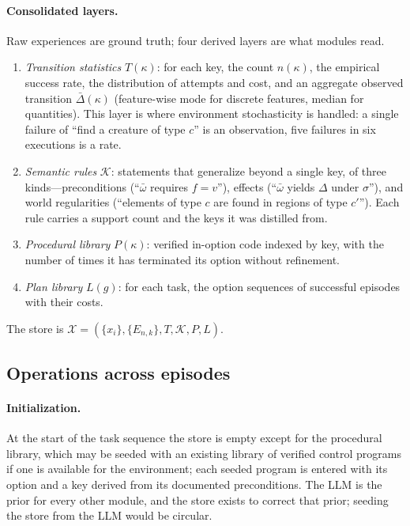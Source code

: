 \documentclass[11pt]{article}
\begin{document}
\paragraph{Consolidated layers.}
Raw experiences are ground truth; four derived layers are what modules read.
\begin{enumerate}[leftmargin=1.5em,itemsep=1pt]
\item \emph{Transition statistics} $T(\kappa)$: for each key, the count $n(\kappa)$, the empirical success rate, the distribution of attempts and cost, and an aggregate observed transition $\bar\Delta(\kappa)$ (feature-wise mode for discrete features, median for quantities). This layer is where environment stochasticity is handled: a single failure of ``find a creature of type $c$'' is an observation, five failures in six executions is a rate.
\item \emph{Semantic rules} $\mathcal{K}$: statements that generalize beyond a single key, of three kinds---preconditions (``$\bar\omega$ requires $f=v$''), effects (``$\bar\omega$ yields $\Delta$ under $\sigma$''), and world regularities (``elements of type $c$ are found in regions of type $c'$''). Each rule carries a support count and the keys it was distilled from.
\item \emph{Procedural library} $P(\kappa)$: verified in-option code indexed by key, with the number of times it has terminated its option without refinement.
\item \emph{Plan library} $L(g)$: for each task, the option sequences of successful episodes with their costs.
\end{enumerate}
The store is $\mathcal{X}=(\{x_i\},\{E_{n,k}\},T,\mathcal{K},P,L)$.

\subsection{Operations across episodes}
\label{sec:type2-ops}

\paragraph{Initialization.}
At the start of the task sequence the store is empty except for the procedural library, which may be seeded with an existing library of verified control programs if one is available for the environment; each seeded program is entered with its option and a key derived from its documented preconditions. The LLM is the prior for every other module, and the store exists to correct that prior; seeding the store from the LLM would be circular.
\end{document}
